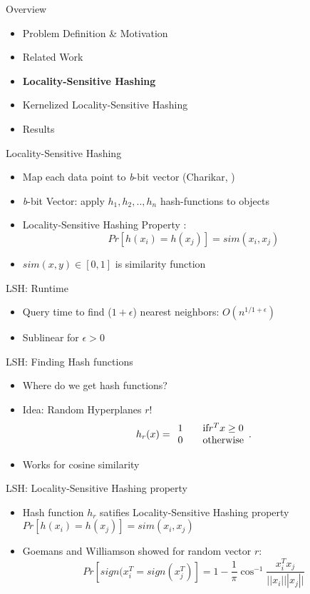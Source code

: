 \documentclass[12pt,a4paper]{beamer}
\begin{document}
\begin{frame}{Overview}
\begin{itemize}
\item Problem Definition \& Motivation
\item Related Work
\item \textbf{Locality-Sensitive Hashing}
\item Kernelized Locality-Sensitive Hashing
\item Results
\end{itemize}
\end{frame}


\begin{frame}{Locality-Sensitive Hashing}
\begin{itemize}
\item Map each data point to \textit{b}-bit vector  (Charikar, \cite{lsh})
\item \textit{b}-bit Vector: apply $h_1,h_2,..,h_n$ hash-functions to objects
\item Locality-Sensitive Hashing Property \cite{lsh}: $$Pr[h(x_i)=h(x_j)]=sim(x_i,x_j)$$
\item $sim(x,y) \in [0,1]$ is similarity function
\end{itemize}
\end{frame}

\begin{frame}{LSH: Runtime}
\begin{itemize}
\item Query time to find ($1+\epsilon$) nearest neighbors: $O(n^{1/1+\epsilon})$
\item Sublinear for $\epsilon>0$
\end{itemize}
\end{frame}


\begin{frame}{LSH: Finding Hash functions}
\begin{itemize}
\item Where do we get hash functions?
\item Idea: Random Hyperplanes $r$!
$$h_r(x)= \begin{array}{l l}
    1 & \quad \text{if} r^Tx \geq 0\\
    0 & \quad \text{otherwise}
  \end{array} .$$
\item Works for cosine similarity
\end{itemize}
\end{frame}

\begin{frame}{LSH: Locality-Sensitive Hashing property}
\begin{itemize}
\item Hash function $h_r$ satifies Locality-Sensitive Hashing property $Pr[h(x_i)=h(x_j)]=sim(x_i,x_j)$
\item Goemans and Williamson showed for random vector $r$:
$$Pr[sign(x^T_{i}=sign(x^T_{j})]=1-\frac{1}{\pi}\cos^{-1}\frac{x^{T}_{i} x_{j}}{||x_{i}| ||x_{j}||}$$
\end{itemize}
\end{frame}
\end{document}
